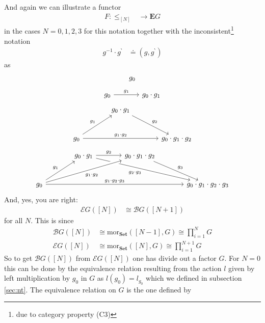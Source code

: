 And again we can illustrate a functor
\begin{align*}
  F
  \colon
  \pmb{\leq}_{[N]}
  &\rightarrow
  \mathbf{E}G
\end{align*}
in the cases $N = 0,1,2,3$ for this notation together with the inconsistent\footnote{due to category property (C3)} notation
\begin{align*}
  g^{-1}
  \cdot
  g^{\backprime}
  &\doteq
  \left(
    g,
    g^{\backprime}
  \right)
\end{align*}
as
\[
\begin{tikzcd}[sep=large]
  g_{0}
\end{tikzcd}
\]
\[
\begin{tikzcd}[sep=large]
  g_{0}
  \arrow{r}{g_{1}}
  &
  g_{0}
  \cdot
  g_{1}
\end{tikzcd}
\]
\[
\begin{tikzcd}[sep=large]
  &
  g_{0}
  \cdot
  g_{1}
  \arrow{rd}{g_{2}}
  &
  \\
  g_{0}
  \arrow{ru}{g_{1}}
  \arrow{rr}{g_{1} \cdot g_{2}}
  &
  &
  g_{0}
  \cdot
  g_{1}
  \cdot
  g_{2}
\end{tikzcd}
\]
\[
\begin{tikzcd}[sep=large]
  &
  g_{0}
  \cdot
  g_{1}
  \arrow{r}{g_{2}}
  \arrow[swap,crossing over]{rrd}{g_{2} \cdot g_{3}}
  &
  g_{0}
  \cdot
  g_{1}
  \cdot
  g_{2}
  \arrow{rd}{g_{3}}
  &
  \\
  g_{0}
  \arrow{ru}{g_{1}}
  \arrow[swap,crossing over]{rru}{g_{1} \cdot g_{2}}
  \arrow{rrr}{g_{1} \cdot g_{2} \cdot g_{3}}
  &
  &
  &
  g_{0}
  \cdot
  g_{1}
  \cdot
  g_{2}
  \cdot
  g_{3}
\end{tikzcd}
\]
And, yes, you are right:
\begin{align*}
  \mathcal{E}G
  \left(
    [N]
  \right)
  &\cong
  \mathcal{B}G
  \left(
    [N + 1]
  \right)
\end{align*}
for all $N$. This is since
\begin{align*}
  \mathcal{B}G
  \left(
    [N]
  \right)
  &\cong
  \mathrm{mor}_{\mathbf{Set}}([N - 1],G)
  \cong
  \prod_{i=1}^{N}
  G
  \\
  \mathcal{E}G
  \left(
    [N]
  \right)
  &\cong
  \mathrm{mor}_{\mathbf{Set}}([N],G)
  \cong
  \prod_{i=1}^{N+1}
  G
\end{align*}
So to get $\mathcal{B}G([N])$ from $\mathcal{E}G([N])$ one has divide out a factor $G$. For $N = 0$ this can be done by the equivalence relation resulting from the action $l$ given by left multiplication by $g_{0}$ in $G$ as $l(g_{0}) = l_{g_{0}}$ which we defined in subsection \ref{sec:nt}. The equivalence relation on $G$ is the one defined by
